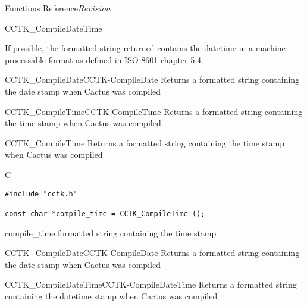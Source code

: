 \begin{cactuspart}{ Functions Reference}{}{$Revision$}
\begin{FunctionDescription}{CCTK\_CompileDateTime}
\begin{Discussion}
If possible, the formatted string returned contains the datetime in a
machine-processable format as defined in ISO 8601 chapter 5.4.
\end{Discussion}

\begin{SeeAlsoSection}
\begin{SeeAlso2}{CCTK\_CompileDate}{CCTK-CompileDate}
  Returns a formatted string containing the date stamp when Cactus was compiled
\end{SeeAlso2}
\begin{SeeAlso2}{CCTK\_CompileTime}{CCTK-CompileTime}
  Returns a formatted string containing the time stamp when Cactus was compiled
\end{SeeAlso2}
\end{SeeAlsoSection}
\end{FunctionDescription}

\begin{FunctionDescription}{CCTK\_CompileTime}
\label{CCTK-CompileTime}
Returns a formatted string containing the time stamp when Cactus was compiled

\begin{SynopsisSection}
\begin{Synopsis}{C}
\begin{verbatim}
#include "cctk.h"

const char *compile_time = CCTK_CompileTime ();
\end{verbatim}
\end{Synopsis}
\end{SynopsisSection}

\begin{ResultSection}
\begin{Result}{compile\_time}
formatted string containing the time stamp
\end{Result}
\end{ResultSection}

\begin{SeeAlsoSection}
\begin{SeeAlso2}{CCTK\_CompileDate}{CCTK-CompileDate}
  Returns a formatted string containing the date stamp when Cactus was compiled
\end{SeeAlso2}
\begin{SeeAlso2}{CCTK\_CompileDateTime}{CCTK-CompileDateTime}
  Returns a formatted string containing the datetime stamp when Cactus was compiled
\end{SeeAlso2}
\end{SeeAlsoSection}
\end{FunctionDescription}



\end{cactuspart}
